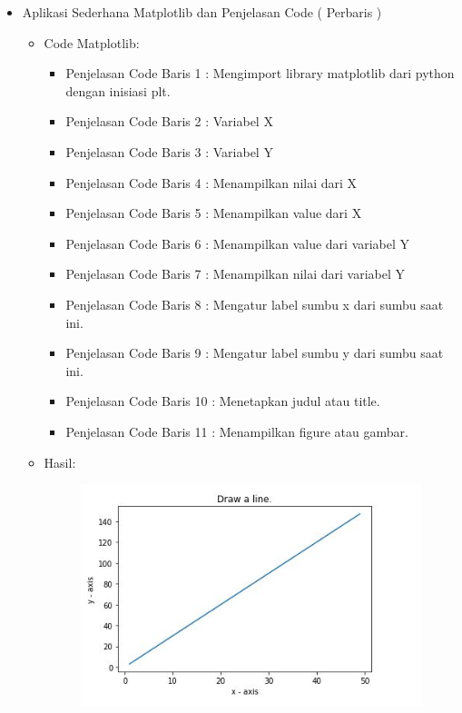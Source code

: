\begin{enumerate}
\begin{itemize}
\begin{itemize}
\par
\par
\item Aplikasi Sederhana Matplotlib dan Penjelasan Code ( Perbaris )
\begin{itemize}
\item Code Matplotlib:
\par 
\par
\begin{itemize}
\item Penjelasan Code Baris 1 : Mengimport library matplotlib dari python dengan inisiasi plt.
\par
\item Penjelasan Code Baris 2 : Variabel X
\par
\item Penjelasan Code Baris 3 : Variabel Y
\par
\item Penjelasan Code Baris 4 : Menampilkan nilai dari X
\par
\item Penjelasan Code Baris 5 : Menampilkan value dari X
\par
\item Penjelasan Code Baris 6 :  Menampilkan value dari variabel Y
\par
\item Penjelasan Code Baris 7 : Menampilkan nilai dari variabel Y
\par
\item Penjelasan Code Baris 8 : Mengatur label sumbu x dari sumbu saat ini.
\par
\item Penjelasan Code Baris 9 : Mengatur label sumbu y dari sumbu saat ini.
\par
\item Penjelasan Code Baris 10 : Menetapkan judul atau title.
\par
\item Penjelasan Code Baris 11 : Menampilkan figure atau gambar.
\par
\end{itemize}
\item Hasil:
\par
\par
\begin{figure}[ht]
\centering
\includegraphics[scale=0.8]{figures/matplotlib.jpg}

\end{figure}
\end{itemize}
\end{itemize}
\end{itemize}
\end{enumerate}
